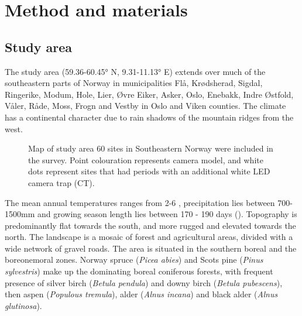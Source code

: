 \chapter{Method and materials}


\section{Study area} %


The study area (59.36-60.45° N, 9.31-11.13° E) extends over much of the southeastern parts of Norway in municipalities Flå, Krødsherad, Sigdal, Ringerike, Modum, Hole, Lier, Øvre Eiker, Asker, Oslo, Enebakk, Indre Østfold, Våler, Råde, Moss, Frogn and Vestby in Oslo and Viken counties. 
The climate has a continental character due to rain shadows of the mountain ridges from the west. 


\begin{figure}
\centering
	\caption[Map of study area]
	{Map of study area %
	60 sites in Southeastern Norway were included in the survey. Point colouration represents camera model, and white dots represent sites that had periods with an additional white LED camera trap (CT).}
	\label{fig:map}
\end{figure}

The mean annual temperatures ranges from 2-6 \celsius , precipitation lies between 700-1500mm and growing season length lies between 170 - 190 days (\cite{Moen1999}).
Topography is predominantly flat towards the south, and more rugged and elevated towards the north. The landscape is a mosaic of forest and agricultural areas, divided with a wide network of gravel roads.
The area is situated in the southern boreal and the boreonemoral zones. %
Norway spruce (\textit{Picea abies}) and Scots pine (\textit{Pinus sylvestris}) make up the dominating boreal coniferous forests, with frequent presence of silver birch (\textit{Betula pendula}) and downy birch (\textit{Betula pubescens}), then aspen (\textit{Populous tremula}), alder (\textit{Alnus incana}) and black alder (\textit{Alnus glutinosa}).



